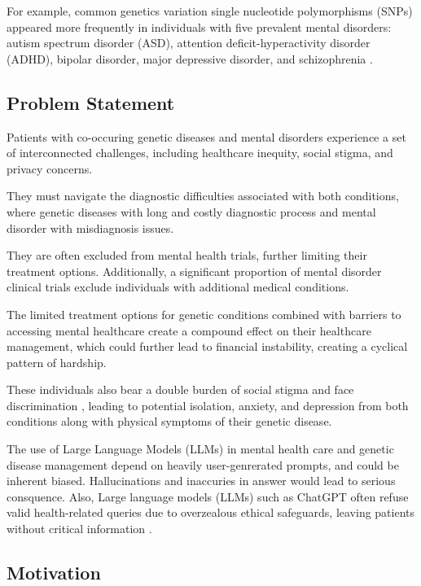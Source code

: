 \documentclass{article} %
\begin{document}
For example, common genetics variation single nucleotide polymorphisms (SNPs) appeared more frequently in individuals with five prevalent mental disorders: autism spectrum disorder (ASD), attention deficit-hyperactivity disorder (ADHD), bipolar disorder, major depressive disorder, and schizophrenia \citep{Cross-Disorder}. 



\subsection{Problem Statement}

Patients with co-occuring genetic diseases and mental disorders experience a set of interconnected challenges, including healthcare inequity, social stigma, and privacy concerns.

They must navigate the diagnostic difficulties associated with both conditions, where genetic diseases with long and costly diagnostic process \citep{Breining_2018} and  mental  disorder with misdiagnosis issues. 

They are often excluded from mental health trials, further limiting their treatment options. Additionally, a significant proportion of mental disorder clinical trials exclude individuals with additional medical conditions. 

The limited treatment options for genetic conditions combined with barriers to accessing mental healthcare create a compound effect on their healthcare management, which could further lead to financial instability, creating a cyclical pattern of hardship.

These individuals also bear a double burden of social stigma and face discrimination \citep{Barriers}, leading to potential isolation, anxiety, and depression from both conditions along with physical symptoms of their genetic disease.

The use of Large Language Models (LLMs) in mental health care and genetic disease management depend on heavily user-genrerated prompts, and could be inherent biased. Hallucinations and inaccuries in answer would lead to serious consquence. Also, Large language models (LLMs) such as ChatGPT often refuse valid health-related queries due to overzealous ethical safeguards, leaving patients without critical information \citep{Guo_2024}.

\subsection{Motivation}
\end{document}
